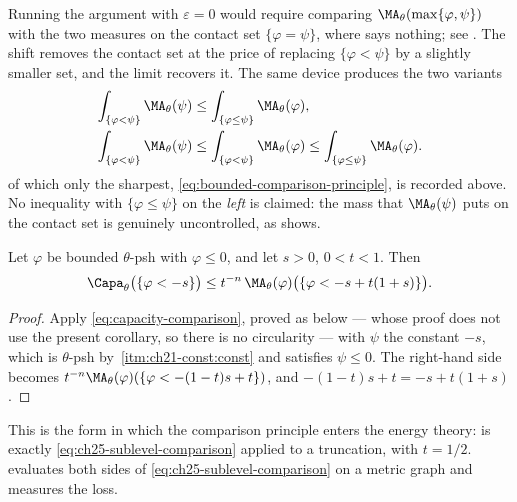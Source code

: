 \begin{remark}
\label{rem:ch25-comparison-shift}
Running the argument with $\varepsilon=0$ would require comparing
$\MA_\theta(\max\{\varphi,\psi\})$ with the two measures on the contact set
$\{\varphi=\psi\}$, where  says
nothing; see .  The shift removes the contact set at
the price of replacing $\{\varphi<\psi\}$ by a slightly smaller set, and
the limit recovers it.  The same device produces the two variants
\[
 \begin{aligned}
 \int_{\{\varphi<\psi\}}\MA_\theta(\psi)
 &\leq\int_{\{\varphi\leq\psi\}}\MA_\theta(\varphi),\\
 \int_{\{\varphi<\psi\}}\MA_\theta(\psi)
 &\leq\int_{\{\varphi<\psi\}}\MA_\theta(\varphi)
 \leq\int_{\{\varphi\leq\psi\}}\MA_\theta(\varphi).
 \end{aligned}
\]
of which only the sharpest,
\eqref{eq:bounded-comparison-principle}, is recorded above.  No inequality
with $\{\varphi\leq\psi\}$ on the \emph{left} is claimed: the mass that
$\MA_\theta(\psi)$ puts on the contact set is genuinely uncontrolled, as
 shows.
\end{remark}

\begin{corollary}
\label{cor:ch25-sublevel-comparison}
Let $\varphi$ be bounded $\theta$-psh with $\varphi\leq0$, and let
$s>0$, $0<t<1$.  Then
\begin{equation}
\label{eq:ch25-sublevel-comparison}
 \Capa_\theta\bigl(\{\varphi<-s\}\bigr)
 \leq t^{-n}\,\MA_\theta(\varphi)
   \bigl(\{\varphi<-s+t(1+s)\}\bigr).
\end{equation}
\end{corollary}

\begin{proof}
Apply \eqref{eq:capacity-comparison}, proved as
 below --- whose proof does not use
the present corollary, so there is no circularity --- with $\psi$ the
constant $-s$, which is $\theta$-psh by
\,\cref{itm:ch21-const:const} and satisfies
$\psi\leq0$.  The right-hand side becomes
$t^{-n}\MA_\theta(\varphi)(\{\varphi<-(1-t)s+t\})$, and
$-(1-t)s+t=-s+t(1+s)$.
\end{proof}

This is the form in which the comparison principle enters the energy theory:
 is exactly
\eqref{eq:ch25-sublevel-comparison} applied to a truncation, with
$t=1/2$.   evaluates both sides of
\eqref{eq:ch25-sublevel-comparison} on a metric graph and measures the loss.

